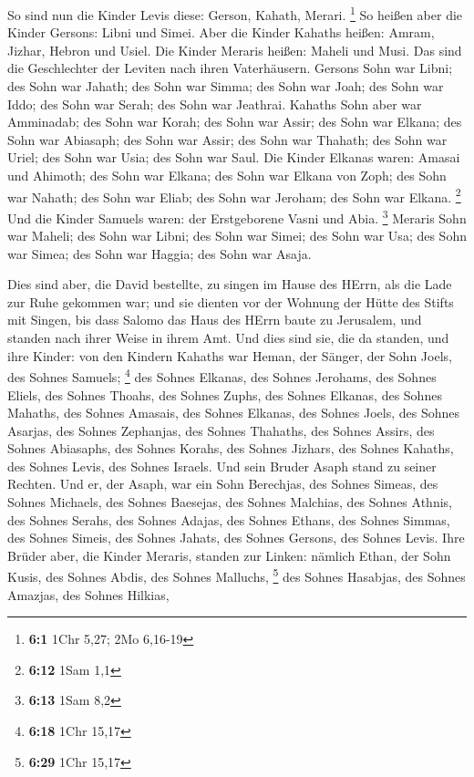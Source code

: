  So sind nun die Kinder Levis diese: Gerson, Kahath, Merari.
\footnote{\textbf{6:1} 1Chr 5,27; 2Mo 6,16-19}  So heißen
aber die Kinder Gersons: Libni und Simei.  Aber die Kinder
Kahaths heißen: Amram, Jizhar, Hebron und Usiel.  Die Kinder
Meraris heißen: Maheli und Musi. Das sind die Geschlechter der Leviten
nach ihren Vaterhäusern.  Gersons Sohn war Libni; des Sohn
war Jahath; des Sohn war Simma;  des Sohn war Joah; des Sohn
war Iddo; des Sohn war Serah; des Sohn war Jeathrai. 
Kahaths Sohn aber war Amminadab; des Sohn war Korah; des Sohn war Assir;
 des Sohn war Elkana; des Sohn war Abiasaph; des Sohn war
Assir;  des Sohn war Thahath; des Sohn war Uriel; des Sohn
war Usia; des Sohn war Saul.  Die Kinder Elkanas waren:
Amasai und Ahimoth;  des Sohn war Elkana; des Sohn war
Elkana von Zoph; des Sohn war Nahath;  des Sohn war Eliab;
des Sohn war Jeroham; des Sohn war Elkana. \footnote{\textbf{6:12} 1Sam
  1,1}  Und die Kinder Samuels waren: der Erstgeborene
Vasni und Abia. \footnote{\textbf{6:13} 1Sam 8,2}  Meraris
Sohn war Maheli; des Sohn war Libni; des Sohn war Simei; des Sohn war
Usa;  des Sohn war Simea; des Sohn war Haggia; des Sohn war
Asaja.

 Dies sind aber, die David bestellte, zu singen im Hause
des HErrn, als die Lade zur Ruhe gekommen war;  und sie
dienten vor der Wohnung der Hütte des Stifts mit Singen, bis dass Salomo
das Haus des HErrn baute zu Jerusalem, und standen nach ihrer Weise in
ihrem Amt.  Und dies sind sie, die da standen, und ihre
Kinder: von den Kindern Kahaths war Heman, der Sänger, der Sohn Joels,
des Sohnes Samuels; \footnote{\textbf{6:18} 1Chr 15,17} 
des Sohnes Elkanas, des Sohnes Jerohams, des Sohnes Eliels, des Sohnes
Thoahs,  des Sohnes Zuphs, des Sohnes Elkanas, des Sohnes
Mahaths, des Sohnes Amasais,  des Sohnes Elkanas, des
Sohnes Joels, des Sohnes Asarjas, des Sohnes Zephanjas, 
des Sohnes Thahaths, des Sohnes Assirs, des Sohnes Abiasaphs, des Sohnes
Korahs,  des Sohnes Jizhars, des Sohnes Kahaths, des Sohnes
Levis, des Sohnes Israels.  Und sein Bruder Asaph stand zu
seiner Rechten. Und er, der Asaph, war ein Sohn Berechjas, des Sohnes
Simeas,  des Sohnes Michaels, des Sohnes Baesejas, des
Sohnes Malchias,  des Sohnes Athnis, des Sohnes Serahs, des
Sohnes Adajas,  des Sohnes Ethans, des Sohnes Simmas, des
Sohnes Simeis,  des Sohnes Jahats, des Sohnes Gersons, des
Sohnes Levis.  Ihre Brüder aber, die Kinder Meraris,
standen zur Linken: nämlich Ethan, der Sohn Kusis, des Sohnes Abdis, des
Sohnes Malluchs, \footnote{\textbf{6:29} 1Chr 15,17}  des
Sohnes Hasabjas, des Sohnes Amazjas, des Sohnes Hilkias,

